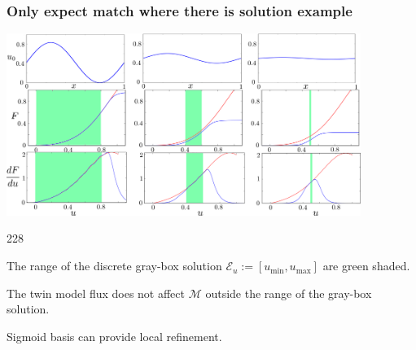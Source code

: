 \documentclass{beamer}
\newcommand{\barrow}{\item[\color{darkred}\ding{228}]}
\begin{document}
\begin{frame}
    \frametitle{Only expect match where there is solution \hfill \scriptsize{example}} \small
    \begin{center}
        \includegraphics[width=11.5cm]{combine_3_inits.png}
    \end{center}
     \scriptsize
     \vspace{-.15cm}
     \begin{dinglist}{228}
        \barrow The range of the discrete gray-box solution $\mathcal{E}_u :=[u_{\min},u_{\max}]$
                 are green shaded.
        \barrow The twin model flux does not affect 
                $\mathcal{M}$ outside the range of the gray-box solution.
        \barrow Sigmoid basis can provide local refinement.
     \end{dinglist}
\end{frame}
\end{document}
